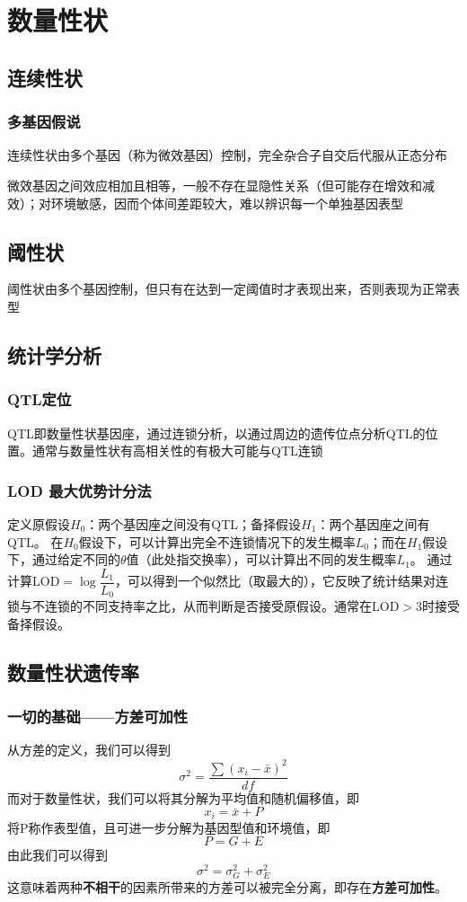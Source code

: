 \documentclass[a4paper, 12pt]{report}
\begin{document}
\chapter{数量性状}
\section{连续性状}
\subsection{多基因假说}
连续性状由多个基因（称为微效基因）控制，完全杂合子自交后代服从正态分布

微效基因之间效应相加且相等，一般不存在显隐性关系（但可能存在增效和减效）；对环境敏感，因而个体间差距较大，难以辨识每一个单独基因表型
\section{阈性状}
阈性状由多个基因控制，但只有在达到一定阈值时才表现出来，否则表现为正常表型
\section{统计学分析}
\subsection{QTL定位}
QTL即数量性状基因座，通过连锁分析，以通过周边的遗传位点分析QTL的位置。通常与数量性状有高相关性的有极大可能与QTL连锁
\subsection{LOD 最大优势计分法}
定义原假设\(H_0\)：两个基因座之间没有QTL；备择假设\(H_1\)：两个基因座之间有QTL。
在\(H_0\)假设下，可以计算出完全不连锁情况下的发生概率\(L_0\)；而在\(H_1\)假设下，通过给定不同的\(\theta\)值（此处指交换率），可以计算出不同的发生概率\(L_1\)。
通过计算\(\mathrm{LOD} = \log{\dfrac{L_1}{L_0}}\)，可以得到一个似然比（取最大的），它反映了统计结果对连锁与不连锁的不同支持率之比，从而判断是否接受原假设。通常在\(\mathrm{LOD} > 3\)时接受备择假设。
\section{数量性状遗传率}
\subsection{一切的基础——方差可加性}
从方差的定义，我们可以得到\[\sigma^2 = \dfrac{\sum(x_i-\bar{x})^2}{df}\]
而对于数量性状，我们可以将其分解为平均值和随机偏移值，即\[x_i=\bar{x}+P\]
将P称作表型值，且可进一步分解为基因型值和环境值，即\[P=G+E\]
由此我们可以得到\[\sigma^2 = \sigma^2_G + \sigma^2_E\]
这意味着两种\textbf{不相干}的因素所带来的方差可以被完全分离，即存在\textbf{方差可加性}。
\end{document}

